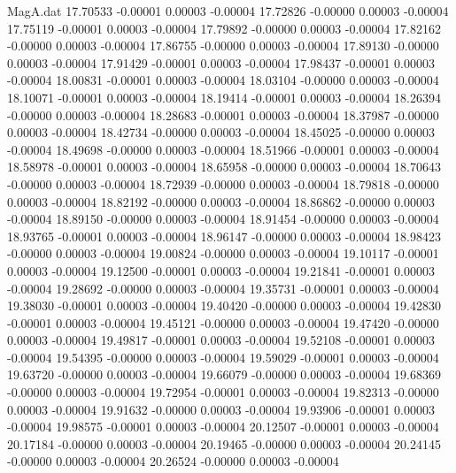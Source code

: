 \begin{filecontents}{MagA.dat}
  17.70533   -0.00001    0.00003   -0.00004
  17.72826   -0.00000    0.00003   -0.00004
  17.75119   -0.00001    0.00003   -0.00004
  17.79892   -0.00000    0.00003   -0.00004
  17.82162   -0.00000    0.00003   -0.00004
  17.86755   -0.00000    0.00003   -0.00004
  17.89130   -0.00000    0.00003   -0.00004
  17.91429   -0.00001    0.00003   -0.00004
  17.98437   -0.00001    0.00003   -0.00004
  18.00831   -0.00001    0.00003   -0.00004
  18.03104   -0.00000    0.00003   -0.00004
  18.10071   -0.00001    0.00003   -0.00004
  18.19414   -0.00001    0.00003   -0.00004
  18.26394   -0.00000    0.00003   -0.00004
  18.28683   -0.00001    0.00003   -0.00004
  18.37987   -0.00000    0.00003   -0.00004
  18.42734   -0.00000    0.00003   -0.00004
  18.45025   -0.00000    0.00003   -0.00004
  18.49698   -0.00000    0.00003   -0.00004
  18.51966   -0.00001    0.00003   -0.00004
  18.58978   -0.00001    0.00003   -0.00004
  18.65958   -0.00000    0.00003   -0.00004
  18.70643   -0.00000    0.00003   -0.00004
  18.72939   -0.00000    0.00003   -0.00004
  18.79818   -0.00000    0.00003   -0.00004
  18.82192   -0.00000    0.00003   -0.00004
  18.86862   -0.00000    0.00003   -0.00004
  18.89150   -0.00000    0.00003   -0.00004
  18.91454   -0.00000    0.00003   -0.00004
  18.93765   -0.00001    0.00003   -0.00004
  18.96147   -0.00000    0.00003   -0.00004
  18.98423   -0.00000    0.00003   -0.00004
  19.00824   -0.00000    0.00003   -0.00004
  19.10117   -0.00001    0.00003   -0.00004
  19.12500   -0.00001    0.00003   -0.00004
  19.21841   -0.00001    0.00003   -0.00004
  19.28692   -0.00000    0.00003   -0.00004
  19.35731   -0.00001    0.00003   -0.00004
  19.38030   -0.00001    0.00003   -0.00004
  19.40420   -0.00000    0.00003   -0.00004
  19.42830   -0.00001    0.00003   -0.00004
  19.45121   -0.00000    0.00003   -0.00004
  19.47420   -0.00000    0.00003   -0.00004
  19.49817   -0.00001    0.00003   -0.00004
  19.52108   -0.00001    0.00003   -0.00004
  19.54395   -0.00000    0.00003   -0.00004
  19.59029   -0.00001    0.00003   -0.00004
  19.63720   -0.00000    0.00003   -0.00004
  19.66079   -0.00000    0.00003   -0.00004
  19.68369   -0.00000    0.00003   -0.00004
  19.72954   -0.00001    0.00003   -0.00004
  19.82313   -0.00000    0.00003   -0.00004
  19.91632   -0.00000    0.00003   -0.00004
  19.93906   -0.00001    0.00003   -0.00004
  19.98575   -0.00001    0.00003   -0.00004
  20.12507   -0.00001    0.00003   -0.00004
  20.17184   -0.00000    0.00003   -0.00004
  20.19465   -0.00000    0.00003   -0.00004
  20.24145   -0.00000    0.00003   -0.00004
  20.26524   -0.00000    0.00003   -0.00004

\end{filecontents}
